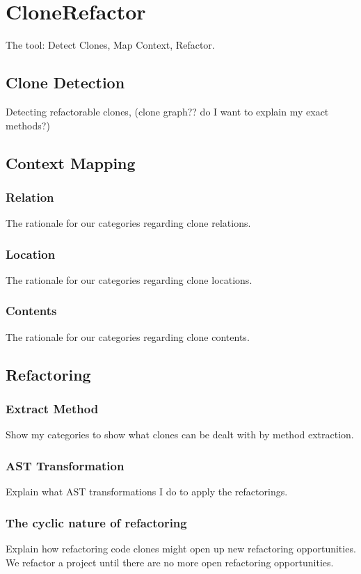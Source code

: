 \documentclass[conference]{IEEEtran}
\begin{document}
\section{CloneRefactor}
The tool: Detect Clones, Map Context, Refactor.

\subsection{Clone Detection}
Detecting refactorable clones, (clone graph?? do I want to explain my exact methods?)

\subsection{Context Mapping}
\subsubsection{Relation}
The rationale for our categories regarding clone relations.

\subsubsection{Location}
The rationale for our categories regarding clone locations.

\subsubsection{Contents}
The rationale for our categories regarding clone contents.

\subsection{Refactoring}
\subsubsection{Extract Method}
Show my categories to show what clones can be dealt with by method extraction.

\subsubsection{AST Transformation}
Explain what AST transformations I do to apply the refactorings.

\subsubsection{The cyclic nature of refactoring}
Explain how refactoring code clones might open up new refactoring opportunities. We refactor a project until there are no more open refactoring opportunities.
\end{document}
